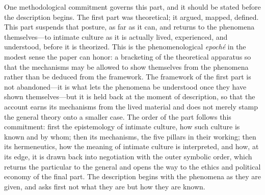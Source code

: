 One methodological commitment governs this part, and it should be stated before the description begins. The first part was theoretical; it argued, mapped, defined. This part suspends that posture, as far as it can, and returns to the phenomena themselves---to intimate culture as it is actually lived, experienced, and understood, before it is theorized. This is the phenomenological \emph{epoch\'e} in the modest sense the paper can honor: a bracketing of the theoretical apparatus so that the mechanisms may be allowed to show themselves from the phenomena rather than be deduced from the framework. The framework of the first part is not abandoned---it is what lets the phenomena be understood once they have shown themselves---but it is held back at the moment of description, so that the account earns its mechanisms from the lived material and does not merely stamp the general theory onto a smaller case. The order of the part follows this commitment: first the epistemology of intimate culture, how such culture is known and by whom; then its mechanisms, the five pillars in their working; then its hermeneutics, how the meaning of intimate culture is interpreted, and how, at its edge, it is drawn back into negotiation with the outer symbolic order, which returns the particular to the general and opens the way to the ethics and political economy of the final part. The description begins with the phenomena as they are given, and asks first not what they are but how they are known.
